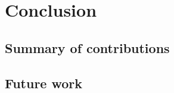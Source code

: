 \chapter{Conclusion}\label{chapter:Conclusion}
%
%



\section{Summary of contributions}\label{sec:summary_of_contributions}
%
%



\section{Future work}\label{sec:future_work}
%
%